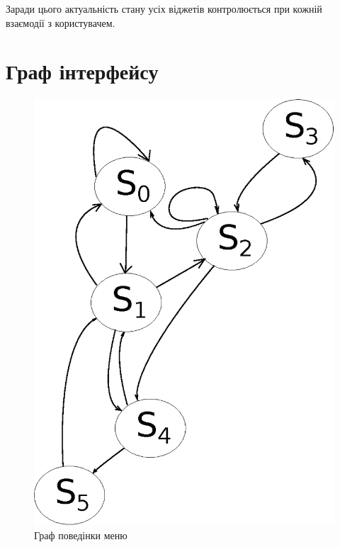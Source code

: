 \documentclass[a4paper,notitlepage,headsepline,pdftex,oneside]{report}
\newcommand{\setfontsize}[1]{\fontsize{#1pt}{#1pt}\selectfont}
\newcommand{\Section}[1]{\section{#1} \renewcommand{\baselinestretch}{1.5}\setfontsize{14pt}}
\begin{document}
  Заради цього актуальність стану усіх віджетів контролюється при кожній
  взаємодії з користувачем.
  \clearpage
  \Section{Граф інтерфейсу}
    \begin{figure}[h]
      \centering
      \includegraphics{gui-graph.eps}
      \caption{Граф поведінки меню}
      \label{fig:graph-gui}
    \end{figure}
\end{document}
